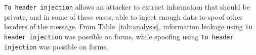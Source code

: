 \texttt{To header injection} allows an attacker to extract information that should be private,
and in some of these cases, able to inject enough data to spoof other headers of the \email message. From Table~\ref{tab:analysis}, information leakage using \texttt{To header injection} was possible on \ehito forms, while spoofing using \texttt{To header injection} was possible on \ehitoxcheck forms.
    
    
